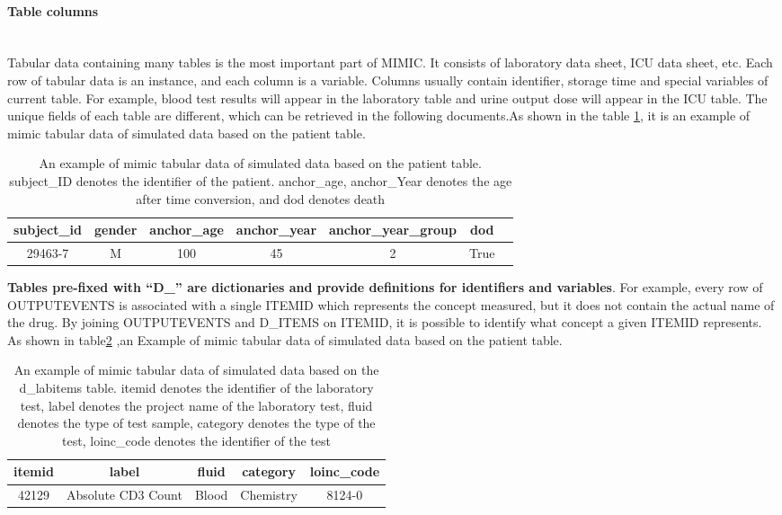 \paragraph{Table columns}~\\
Tabular data containing many tables is the most important part of MIMIC. It consists of laboratory data sheet, ICU data sheet, etc. Each row of tabular data is an instance, and each column is a variable. Columns usually contain identifier, storage time and special variables of current table. For example, blood test results will appear in the laboratory table and urine output dose will appear in the ICU table. The unique fields of each table are different, which can be retrieved in the following documents.As shown in the table \ref{tab:Example of MIMIC tabular data}, it is an example of mimic tabular data of simulated data based on the patient table.
\begin{table}[ht]
\centering
\caption{An example of mimic tabular data of simulated data based on the patient table. subject\_ID denotes the identifier of the patient. anchor\_age, anchor\_Year denotes the age after time conversion, and dod denotes death}
\label{tab:Example of MIMIC tabular data}
\begin{tabular}{ccccccc}
\toprule
\textbf{subject\_id} & \textbf{gender} & \textbf{anchor\_age} & \textbf{anchor\_year} & \textbf{anchor\_year\_group}& \textbf{dod} \\ \midrule
29463-7 & M & 100 & 45 & 2 & True \\ \bottomrule
\end{tabular}
\end{table}

\textbf{Tables pre-fixed with “D\_” are dictionaries and provide definitions for identifiers and variables}. For example, every row of OUTPUTEVENTS is associated with a single ITEMID which represents the concept measured, but it does not contain the actual name of the drug. By joining OUTPUTEVENTS and D\_ITEMS on ITEMID, it is possible to identify what concept a given ITEMID represents. As shown in table\ref{tab:Example of MIMIC tabular data dictionary} ,an Example of mimic tabular data of simulated data based on the patient table.

\begin{table}[ht]
\centering
\caption{An example of mimic tabular data of simulated data based on the d\_labitems table. itemid denotes the identifier of the laboratory test, label denotes the project name of the laboratory test, fluid denotes the type of test sample, category denotes the type of the test, loinc\_code denotes the identifier of the test}
\label{tab:Example of MIMIC tabular data dictionary}
\begin{tabular}{ccccc}
\toprule
\textbf{itemid} & \textbf{label} & \textbf{fluid} & \textbf{category} & \textbf{loinc\_code}\\ \midrule
42129 & Absolute CD3 Count & Blood & Chemistry & 8124-0 \\ \bottomrule
\end{tabular}
\end{table}


